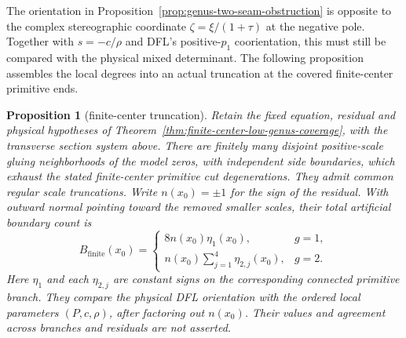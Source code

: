 \documentclass[11pt]{amsart}
\newtheorem{proposition}[theorem]{Proposition}
\theoremstyle{definition}
\theoremstyle{remark}
\theoremstyle{plain}
\begin{document}
The orientation in Proposition~\ref{prop:genus-two-seam-obstruction}
is opposite to the complex stereographic coordinate
$\zeta=\xi/(1+\tau)$ at the negative pole. Together with
$s=-c/\rho$ and DFL's positive-$p_1$ coorientation, this must
still be compared with the physical mixed determinant.
The following proposition assembles the local degrees into an
actual truncation at the covered finite-center primitive ends.

\begin{proposition}[finite-center truncation]
\label{prop:finite-center-truncation}
Retain the fixed equation, residual and physical hypotheses of
Theorem~\ref{thm:finite-center-low-genus-coverage}, with the
transverse section system above. There are finitely many disjoint
positive-scale gluing neighborhoods of the model zeros, with
independent side boundaries, which exhaust the stated finite-center
primitive cut degenerations. They admit common regular scale
truncations. Write $n(x_0)=\pm1$ for the sign of the residual.
With outward normal pointing toward the removed smaller scales,
their total artificial boundary count is
\begin{equation}\label{eq:finite-center-signed-boundary}
 B_{\mathrm{finite}}(x_0)=
 \begin{cases}
  8n(x_0)\eta_1(x_0),&g=1,\\
  n(x_0)\displaystyle\sum_{j=1}^4\eta_{2,j}(x_0),&g=2.
 \end{cases}
\end{equation}
Here $\eta_1$ and each $\eta_{2,j}$ are constant signs on
the corresponding connected primitive branch. They compare the
physical DFL orientation with the ordered local parameters
$(P,c,\rho)$, after factoring out $n(x_0)$.
Their values and agreement across branches and residuals
are not asserted.
\end{proposition}
\end{document}
